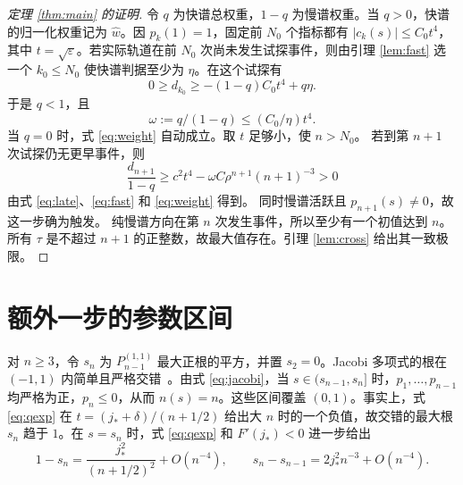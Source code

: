 \documentclass[11pt,a4paper,UTF8,fontset=fandol]{ctexart}
\newcommand{\eps}{\varepsilon}
\begin{document}
\begin{proof}[定理 \ref{thm:main} 的证明]
令 \(q\) 为快谱总权重，\(1-q\) 为慢谱权重。当 \(q>0\)，快谱的归一化权重记为 \(\widehat w\)。因 \(p_k(1)=1\)，固定前 \(N_0\) 个指标都有 \(|c_k(s)|\le C_0t^4\)，其中 \(t=\sqrt\eps\)。若实际轨道在前 \(N_0\) 次尚未发生试探事件，则由引理 \ref{lem:fast} 选一个 \(k_0\le N_0\) 使快谱判据至少为 \(\eta\)。在这个试探有
\[
 0\ge d_{k_0}\ge -(1-q)C_0t^4+q\eta .
\]
于是 \(q<1\)，且
\begin{equation}
 \omega:=q/(1-q)\le (C_0/\eta)t^4.
 \label{eq:weight}
\end{equation}
当 \(q=0\) 时，式 \eqref{eq:weight} 自动成立。取 \(t\) 足够小，使 \(n>N_0\)。
若到第 \(n+1\) 次试探仍无更早事件，则
\[
 \frac{d_{n+1}}{1-q}
 \ge c^2t^4-\omega C\rho^{n+1}(n+1)^{-3}>0
\]
由式 \eqref{eq:late}、\eqref{eq:fast} 和 \eqref{eq:weight} 得到。
同时慢谱活跃且 \(p_{n+1}(s)\ne0\)，故这一步确为触发。
纯慢谱方向在第 \(n\) 次发生事件，所以至少有一个初值达到 \(n\)。
所有 \(\tau\) 是不超过 \(n+1\) 的正整数，故最大值存在。引理 \ref{lem:cross} 给出其一致极限。
\end{proof}

\section{额外一步的参数区间}
对 \(n\ge3\)，令 \(s_n\) 为 \(P_{n-1}^{(1,1)}\) 最大正根的平方，并置 \(s_2=0\)。Jacobi 多项式的根在 \((-1,1)\) 内简单且严格交错~\cite[第 18.2(vi) 节]{dlmf}。由式 \eqref{eq:jacobi}，当 \(s\in(s_{n-1},s_n]\) 时，\(p_1,\ldots,p_{n-1}\) 均严格为正，\(p_n\le0\)，从而 \(n(s)=n\)。这些区间覆盖 \((0,1)\)。事实上，式 \eqref{eq:qexp} 在 \(t=(j_*+\delta)/(n+1/2)\) 给出大 \(n\) 时的一个负值，故交错的最大根 \(s_n\) 趋于 \(1\)。在 \(s=s_n\) 时，式 \eqref{eq:qexp} 和 \(F'(j_*)<0\) 进一步给出
\begin{equation}
 1-s_n=\frac{j_*^2}{(n+1/2)^2}+O(n^{-4}),
 \qquad
 s_n-s_{n-1}=2j_*^2n^{-3}+O(n^{-4}).
 \label{eq:rootshift}
\end{equation}
\end{document}

